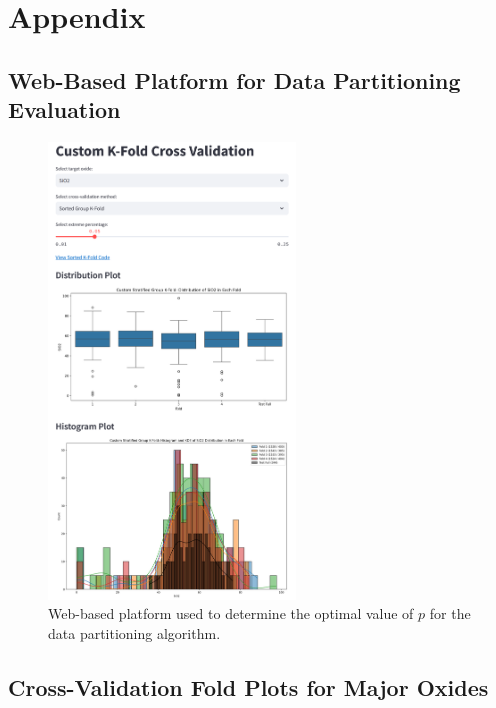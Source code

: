 \onecolumn
\section{Appendix}
\renewcommand{\thesection}{\Alph{section}}
\renewcommand{\thefigure}{\Alph{section}.\arabic{figure}}
\renewcommand{\thetable}{\Alph{section}.\arabic{table}}
\setcounter{figure}{0}
\setcounter{table}{0}

\subsection{Web-Based Platform for Data Partitioning Evaluation}\label{subsec:web_platform}
\begin{figure}[!htb]
    \centering
    \includegraphics[width=0.585\textwidth]{images/web_platform.png}
    \caption{Web-based platform used to determine the optimal value of $p$ for the data partitioning algorithm.}
    \label{fig:web_platform}
\end{figure}

\newpage
\FloatBarrier

\subsection{Cross-Validation Fold Plots for Major Oxides}\label{subsec:cv_plots}

